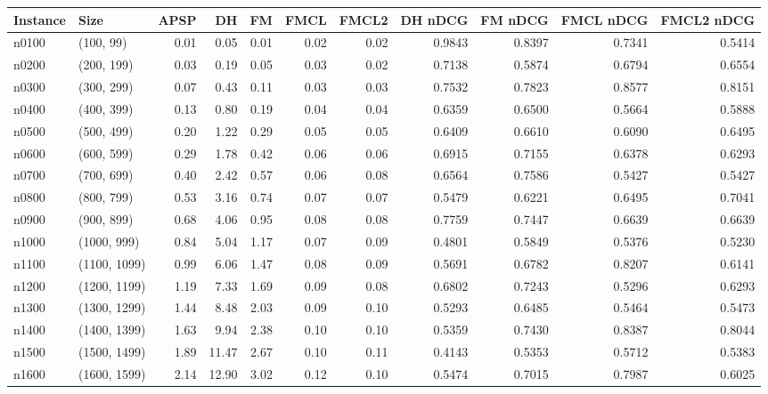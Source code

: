 \begin{tabular}{llrrrrrrrrr}
\toprule
Instance &         Size &  APSP &    DH &   FM &  FMCL &  FMCL2 &  DH nDCG &  FM nDCG &  FMCL nDCG &  FMCL2 nDCG \\
\midrule
   n0100 &    (100, 99) &  0.01 &  0.05 & 0.01 &  0.02 &   0.02 &   0.9843 &   0.8397 &     0.7341 &      0.5414 \\
   n0200 &   (200, 199) &  0.03 &  0.19 & 0.05 &  0.03 &   0.02 &   0.7138 &   0.5874 &     0.6794 &      0.6554 \\
   n0300 &   (300, 299) &  0.07 &  0.43 & 0.11 &  0.03 &   0.03 &   0.7532 &   0.7823 &     0.8577 &      0.8151 \\
   n0400 &   (400, 399) &  0.13 &  0.80 & 0.19 &  0.04 &   0.04 &   0.6359 &   0.6500 &     0.5664 &      0.5888 \\
   n0500 &   (500, 499) &  0.20 &  1.22 & 0.29 &  0.05 &   0.05 &   0.6409 &   0.6610 &     0.6090 &      0.6495 \\
   n0600 &   (600, 599) &  0.29 &  1.78 & 0.42 &  0.06 &   0.06 &   0.6915 &   0.7155 &     0.6378 &      0.6293 \\
   n0700 &   (700, 699) &  0.40 &  2.42 & 0.57 &  0.06 &   0.08 &   0.6564 &   0.7586 &     0.5427 &      0.5427 \\
   n0800 &   (800, 799) &  0.53 &  3.16 & 0.74 &  0.07 &   0.07 &   0.5479 &   0.6221 &     0.6495 &      0.7041 \\
   n0900 &   (900, 899) &  0.68 &  4.06 & 0.95 &  0.08 &   0.08 &   0.7759 &   0.7447 &     0.6639 &      0.6639 \\
   n1000 &  (1000, 999) &  0.84 &  5.04 & 1.17 &  0.07 &   0.09 &   0.4801 &   0.5849 &     0.5376 &      0.5230 \\
   n1100 & (1100, 1099) &  0.99 &  6.06 & 1.47 &  0.08 &   0.09 &   0.5691 &   0.6782 &     0.8207 &      0.6141 \\
   n1200 & (1200, 1199) &  1.19 &  7.33 & 1.69 &  0.09 &   0.08 &   0.6802 &   0.7243 &     0.5296 &      0.6293 \\
   n1300 & (1300, 1299) &  1.44 &  8.48 & 2.03 &  0.09 &   0.10 &   0.5293 &   0.6485 &     0.5464 &      0.5473 \\
   n1400 & (1400, 1399) &  1.63 &  9.94 & 2.38 &  0.10 &   0.10 &   0.5359 &   0.7430 &     0.8387 &      0.8044 \\
   n1500 & (1500, 1499) &  1.89 & 11.47 & 2.67 &  0.10 &   0.11 &   0.4143 &   0.5353 &     0.5712 &      0.5383 \\
   n1600 & (1600, 1599) &  2.14 & 12.90 & 3.02 &  0.12 &   0.10 &   0.5474 &   0.7015 &     0.7987 &      0.6025 \\

\end{tabular}

